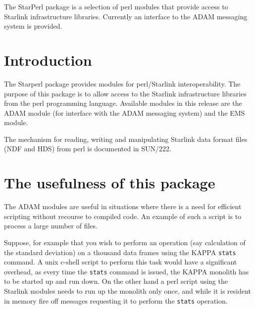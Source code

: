 \documentclass[twoside,11pt]{article}
\newcommand{\stardocinitials}  {SUN}
\newcommand{\stardocnumber}    {228.1}
\newcommand{\stardocabstract}  {The StarPerl package is a selection
of perl modules that provide access to Starlink infrastructure libraries.
Currently an interface to the ADAM messaging system is provided.
}
\newcommand{\stardocname}{\stardocinitials /\stardocnumber}
\newenvironment{latexonly}{}{}
\newcommand{\xref}[3]{#1}
\renewcommand{\_}{\texttt{\symbol{95}}}
\renewcommand{\thepage}{\roman{page}}
\begin{document}
\stardocabstract
  \newpage
  \begin{latexonly}
    \setlength{\parskip}{0mm}
    \tableofcontents
    \setlength{\parskip}{\medskipamount}
    \markboth{\stardocname}{\stardocname}
  \end{latexonly}
\cleardoublepage
\renewcommand{\thepage}{\arabic{page}}
\setcounter{page}{1}


\section{Introduction}

The Starperl package provides modules for perl/Starlink interoperability. The
purpose of this package is to allow access to the Starlink infrastructure
libraries from the \xref{perl}{sun193}{} programming language. Available
modules in this release are the ADAM module (for interface with the ADAM
messaging system) and the EMS module.

The mechanism for reading, writing and manipulating Starlink data format files
(NDF and HDS) from perl is documented in \xref{SUN/222}{sun222}{}.

\section{The usefulness of this package\label{stats}}

The ADAM  modules are useful in situations where there is a need for
efficient scripting without recourse to compiled code. An example of
such a script is to process a large number of files.

Suppose, for example that you wish to perform an operation (say calculation of
the standard deviation) on a thousand data frames using the
\xref{KAPPA}{sun95}{} \xref{\texttt{stats}}{sun95}{STATS} command. A unix
c-shell script to perform this task would have a significant overhead, as
every time the \texttt{stats} command is issued, the \xref{KAPPA}{sun95}{}
monolith has to be started up and run down. On the other hand a perl script
using the Starlink modules needs to run up the monolith only once, and while
it is resident in memory fire off messages requesting it to perform the
\xref{\texttt{stats}}{sun95}{STATS} operation.
\end{document}
